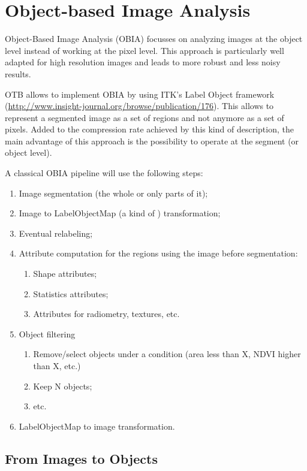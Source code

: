 
\chapter{Object-based Image Analysis }\label{sec:OBIA}

Object-Based Image Analysis (OBIA) focusses on analyzing images at
the object level instead of working at the pixel level. This approach
is particularly well adapted for high resolution images and leads to
more robust and less noisy results.

OTB allows to implement OBIA by using ITK's Label Object framework
(\url{http://www.insight-journal.org/browse/publication/176}). This
allows to represent a segmented image as a set of regions and not
anymore as a set of pixels. Added to the compression rate achieved by
this kind of description, the main advantage of this approach is the
possibility to operate at the segment (or object level).

A classical OBIA pipeline will use the following steps:

\begin{enumerate}
\item Image segmentation (the whole or only parts of it);
\item Image to LabelObjectMap (a kind of ) transformation;
\item Eventual relabeling;
\item Attribute computation for the regions using the image before
  segmentation:
  \begin{enumerate}
         \item Shape attributes;
         \item Statistics attributes;
         \item Attributes for radiometry, textures, etc.
  \end{enumerate}

\item Object filtering
  \begin{enumerate}
         \item Remove/select objects under a condition (area less than X, NDVI higher than X, etc.)
	 \item Keep N objects;
	 \item etc.
  \end{enumerate}
\item LabelObjectMap to image transformation.
\end{enumerate}


\section{From Images to Objects}\label{sec:FromImagesToObjects}



